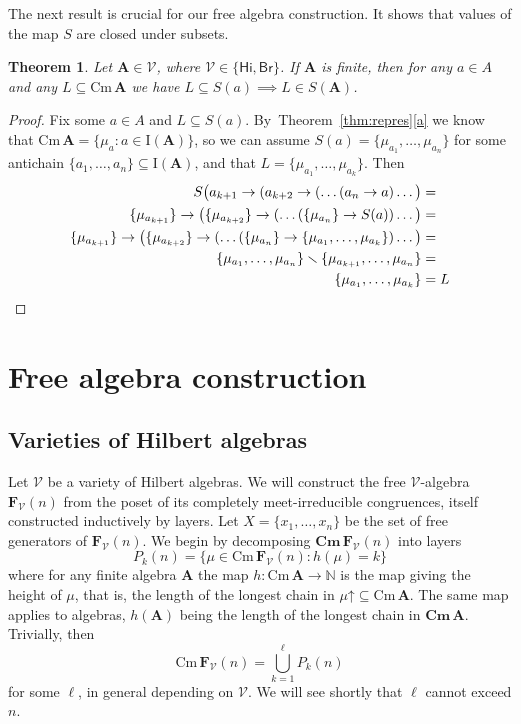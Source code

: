 \documentclass{amsart}
\newtheorem{theorem}{Theorem}[section]
\newcommand{\alg}[1]{\mathbf{#1}}
\newcommand{\var}[1]{\mathsf{#1}}
\newcommand{\FV}{\alg{F}_\mathcal{V}}
\newcommand{\Cm}[1]{\mathbf{Cm}\, #1}
\newcommand{\cm}[1]{\mathrm{Cm}\, #1}
\newcommand{\irr}[1]{\mathrm{I}(#1)}
\def\ra{\rightarrow}
\def\up#1{{#1}\mathord{\uparrow}}
\begin{document}
The next result is crucial for our free algebra construction. It shows that
values of the map $S$ are closed under subsets.


\begin{theorem}\label{thm:transit} 
Let $\alg{A}\in\mathcal{V}$, where $\mathcal{V}\in \{\var{Hi},\var{Br}\}$.
If $\alg{A}$ is finite, then
for any $a\in A$ and any $L\subseteq \cm{\alg{A}}$ we have
$L\subseteq S(a)\implies L\in S(\alg{A})$.
\end{theorem}

\begin{proof}
Fix some $a\in A$ and $L\subseteq S(a)$. By~Theorem~\ref{thm:repres}\eqref{a} we know
that $\cm{\alg{A}} =  \{\mu_a: a\in \irr{\alg{A}}\}$, so we can assume
$S(a) = \{\mu_{a_1},\dots,\mu_{a_n}\}$ for some antichain
$\{a_1,\dots,a_n\}\subseteq \irr{\alg{A}}$, and that $L =
\{\mu_{a_1},\dots,\mu_{a_k}\}$.  Then
\begin{align*}
  S\bigl(a_{k+1}\ra(a_{k+2}\ra( \dots (a_n\ra a)\dots\bigr) &= \\
\{\mu_{a_{k+1}}\}\ra\bigl(\{\mu_{a_{k+2}}\}\ra(\dots (\{\mu_{a_n}\}\ra
  S(a))\dots\bigr) &= \\
\{\mu_{a_{k+1}}\}\ra\bigl(\{\mu_{a_{k+2}}\}\ra(\dots (\{\mu_{a_n}\}\ra  
  \{\mu_{a_1},\dots,\mu_{a_k}\})\dots\bigr) &= \\
  \{\mu_{a_1},\dots,\mu_{a_n}\}\smallsetminus\{\mu_{a_{k+1}},\dots,\mu_{a_n}\} &= \\
\{\mu_{a_1},\dots,\mu_{a_k}\} &= L   \qedhere
\end{align*}  
\end{proof}


\section{Free algebra construction}\label{sec:free-Hi}

\subsection{Varieties of Hilbert algebras}
Let $\mathcal{V}$ be a variety of Hilbert algebras.
We will construct the free $\mathcal{V}$-algebra
$\FV(n)$ from the poset of its completely meet-irreducible congruences,
itself constructed inductively by layers.
Let $X = \{x_1,\dots, x_n\}$ be the set of free generators of
$\FV(n)$. We begin by decomposing $\Cm{\FV(n)}$ into layers 
$$ 
P_k(n) = \{\mu\in \cm{\FV(n)}: h(\mu) = k\}
$$
where for any finite algebra $\alg{A}$ the map
$h\colon \cm{\alg{A}}\to \mathbb{N}$ is the map giving the height of
$\mu$, that is, the length of the longest chain in $\up{\mu}\subseteq
\cm{\alg{A}}$. The same map applies to algebras, $h(\alg{A})$ being the 
length of the longest chain in $\Cm{\alg{A}}$. Trivially, then
$$
\cm{\FV(n)} = \bigcup_{k=1}^\ell P_k(n)
$$
for some $\ell$, in general depending on $\mathcal{V}$.
We will see shortly that $\ell$ cannot exceed $n$. 
\end{document}
